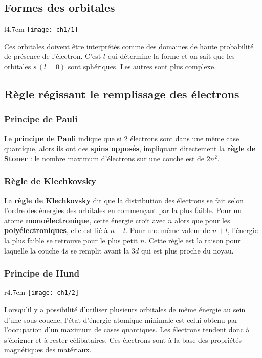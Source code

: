 	\subsection{Formes des orbitales}
		\begin{wrapfigure}[4]{l}{4.7cm}
		\vspace{-5mm}
		\texttt{[image: ch1/1]}
		\end{wrapfigure}
		Ces orbitales doivent être interprétés comme des domaines de haute probabilité de présence de l'électron. C'est $l$ qui détermine la forme et on sait que les orbitales $s\, (l=0)$ sont sphériques. Les autres sont plus complexe. \\
		
	\subsection{Règle régissant le remplissage des électrons}
	\subsubsection{Principe de Pauli}
	Le \textbf{principe de Pauli} indique que si 2 électrons sont dans une même case quantique, alors ils ont des \textbf{spins opposés}, impliquant directement la \textbf{règle de Stoner} : le nombre maximum d'électrons sur une couche est de $2n^2$. 
	
	\subsubsection{Règle de Klechkovsky}
	La \textbf{règle de Klechkovsky} dit que la distribution des électrons se fait selon l'ordre des énergies des orbitales en commençant par la plus faible. Pour un atome \textbf{monoélectronique}, cette énergie croît avec $n$ alors que pour les \textbf{polyélectroniques}, elle est lié à $n+l$. Pour une même valeur de $n+l$, l'énergie la plus faible se retrouve pour le plus petit $n$. Cette règle est la raison pour laquelle la couche $4s$ se remplit avant la $3d$ qui est plus proche du noyau.\\
	
	\subsubsection{Principe de Hund}
	\begin{wrapfigure}[5]{r}{4.7cm}
	\vspace{-5mm}
	\texttt{[image: ch1/2]}
	\end{wrapfigure}
	Lorsqu'il y a possibilité d'utiliser plusieurs orbitales de même énergie au sein d'une sous-couche, l'état d'énergie atomique minimale est celui obtenu par l'occupation d'un maximum de cases quantiques. Les électrons tendent donc à s'éloigner et à rester célibataires. Ces électrons sont à la base des propriétés magnétiques des matériaux. 
	
